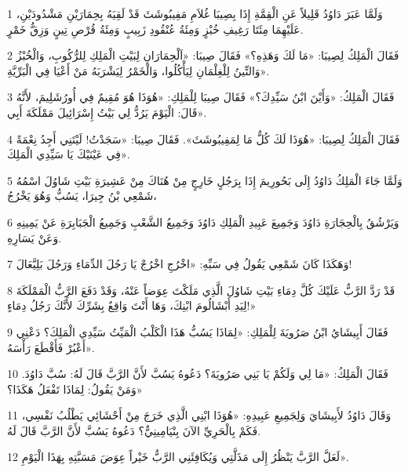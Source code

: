 \par 1 وَلَمَّا عَبَرَ دَاوُدُ قَلِيلاً عَنِ الْقِمَّةِ إِذَا بِصِيبَا غُلاَمِ مَفِيبُوشَثَ قَدْ لَقِيَهُ بِحِمَارَيْنِ مَشْدُودَيْنِ، عَلَيْهِمَا مِئَتَا رَغِيفِ خُبْزٍ وَمِئَةُ عُنْقُودِ زَبِيبٍ وَمِئَةُ قُرْصِ تِينٍ وَزِقُّ خَمْرٍ.
\par 2 فَقَالَ الْمَلِكُ لِصِيبَا: «مَا لَكَ وَهَذِهِ؟» فَقَالَ صِيبَا: «اَلْحِمَارَانِ لِبَيْتِ الْمَلِكِ لِلرُّكُوبِ، وَالْخُبْزُ وَالتِّينُ لِلْغِلْمَانِ لِيَأْكُلُوا، وَالْخَمْرُ لِيَشْرَبَهُ مَنْ أَعْيَا فِي الْبَرِّيَّةِ».
\par 3 فَقَالَ الْمَلِكُ: «وَأَيْنَ ابْنُ سَيِّدِكَ؟» فَقَالَ صِيبَا لِلْمَلِكِ: «هُوَذَا هُوَ مُقِيمٌ فِي أُورُشَلِيمَ، لأَنَّهُ قَالَ: الْيَوْمَ يَرُدُّ لِي بَيْتُ إِسْرَائِيلَ مَمْلَكَةَ أَبِي».
\par 4 فَقَالَ الْمَلِكُ لِصِيبَا: «هُوَذَا لَكَ كُلُّ مَا لِمَفِيبُوشَثَ». فَقَالَ صِيبَا: «سَجَدْتُ! لَيْتَنِي أَجِدُ نِعْمَةً فِي عَيْنَيْكَ يَا سَيِّدِي الْمَلِكَ».
\par 5 وَلَمَّا جَاءَ الْمَلِكُ دَاوُدُ إِلَى بَحُورِيمَ إِذَا بِرَجُلٍ خَارِجٍ مِنْ هُنَاكَ مِنْ عَشِيرَةِ بَيْتِ شَاوُلَ اسْمُهُ شَمْعِي بْنُ جِيرَا، يَسُبُّ وَهُوَ يَخْرُجُ،
\par 6 وَيَرْشُقُ بِالْحِجَارَةِ دَاوُدَ وَجَمِيعَ عَبِيدِ الْمَلِكِ دَاوُدَ وَجَمِيعُ الشَّعْبِ وَجَمِيعُ الْجَبَابِرَةِ عَنْ يَمِينِهِ وَعَنْ يَسَارِهِ.
\par 7 وَهَكَذَا كَانَ شَمْعِي يَقُولُ فِي سَبِّهِ: «اخْرُجِ اخْرُجْ يَا رَجُلَ الدِّمَاءِ وَرَجُلَ بَلِيَّعَالَ!
\par 8 قَدْ رَدَّ الرَّبُّ عَلَيْكَ كُلَّ دِمَاءِ بَيْتِ شَاوُلَ الَّذِي مَلَكْتَ عِوَضاً عَنْهُ، وَقَدْ دَفَعَ الرَّبُّ الْمَمْلَكَةَ لِيَدِ أَبْشَالُومَ ابْنِكَ، وَهَا أَنْتَ وَاقِعٌ بِشَرِّكَ لأَنَّكَ رَجُلُ دِمَاءٍ!»
\par 9 فَقَالَ أَبِيشَايُ ابْنُ صَرُويَةَ لِلْمَلِكِ: «لِمَاذَا يَسُبُّ هَذَا الْكَلْبُ الْمَيِّتُ سَيِّدِي الْمَلِكَ؟ دَعْنِي أَعْبُرْ فَأَقْطَعَ رَأْسَهُ».
\par 10 فَقَالَ الْمَلِكُ: «مَا لِي وَلَكُمْ يَا بَنِي صَرُويَةَ؟ دَعُوهُ يَسُبَّ لأَنَّ الرَّبَّ قَالَ لَهُ: سُبَّ دَاوُدَ. وَمَنْ يَقُولُ: لِمَاذَا تَفْعَلُ هَكَذَا؟»
\par 11 وَقَالَ دَاوُدُ لأَبِيشَايَ وَلِجَمِيعِ عَبِيدِهِ: «هُوَذَا ابْنِي الَّذِي خَرَجَ مِنْ أَحْشَائِي يَطْلُبُ نَفْسِي، فَكَمْ بِالْحَرِيِّ الآنَ بِنْيَامِينِيٌّ؟ دَعُوهُ يَسُبَّ لأَنَّ الرَّبَّ قَالَ لَهُ.
\par 12 لَعَلَّ الرَّبَّ يَنْظُرُ إِلَى مَذَلَّتِي وَيُكَافِئَنِي الرَّبُّ خَيْراً عِوَضَ مَسَبَّتِهِ بِهَذَا الْيَوْمِ».
